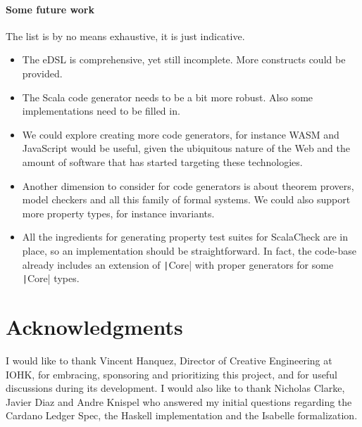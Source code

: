\documentclass[11pt]{article}
\newcommand{\ScalaI}[1]{\texttt|#1|}
\begin{document}
\paragraph*{Some future work}
The list is by no means exhaustive, it is just indicative.
\begin{itemize}
  \item The eDSL is comprehensive, yet still incomplete. More constructs 
  could be provided.
  
  \item The Scala code generator needs to be a bit more robust. Also some 
  implementations need to be filled in.
  
  \item We could explore creating more code generators, for instance WASM and 
  JavaScript would be useful, given the ubiquitous nature of the Web and the 
  amount of software that has started targeting these technologies.
  
  \item Another dimension to consider for code generators is about theorem 
  provers, model checkers and all this family of formal systems. We could 
  also support more property types, for instance invariants.
  
  \item All the ingredients for generating property test suites for 
  ScalaCheck are in place, so an implementation should be straightforward. In 
  fact, the code-base already includes an extension of \ScalaI{Core} with 
  proper generators for some \ScalaI{Core} types.
\end{itemize}

\section{Acknowledgments}
I would like to thank Vincent Hanquez, Director of Creative Engineering at 
IOHK, for embracing, sponsoring and prioritizing this project, and for useful 
discussions during its development. I would also like to thank Nicholas 
Clarke, Javier Diaz and Andre Knispel who answered my initial questions 
regarding the Cardano Ledger Spec, the Haskell implementation and the 
Isabelle formalization.



\end{document}
